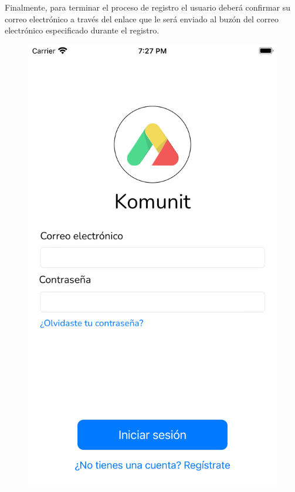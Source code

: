 \begin{appendices}
        Finalmente, para terminar el proceso de registro el usuario deberá confirmar su correo electrónico a través del enlace que le será enviado al buzón del correo electrónico especificado durante el registro.
    \begin{figure}[H]
    \centering
    \begin{minipage}{0.3\textwidth}
        \centering
        \includegraphics[cframe=black 2pt, width=1\linewidth]{images/manual/login.png}
    \end{minipage}

\end{figure}
\end{appendices}
